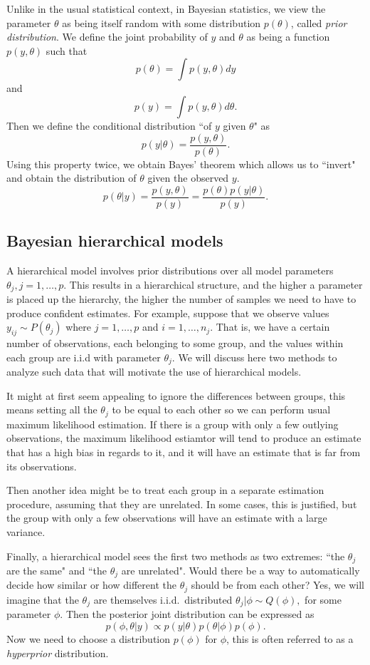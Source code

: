 \documentclass{scrartcl}
\newcommand{\1}{\mathds{1}}
\begin{document}
Unlike in the usual statistical context, in Bayesian statistics, we view the parameter $\theta$ as
being itself random with some distribution $p(\theta)$, called \emph{prior distribution}. We define the joint
probability of $y$ and $\theta$ as being a function $p(y,\theta)$ such that
\[p(\theta)         = \int p(y,\theta) dy      \]
and
\[p(y)  = \int p(y,\theta) d\theta.\]
Then we define the conditional distribution ``of $y$ given $\theta$" as
\[
	p(y|\theta) = \frac{p(y,\theta)}{p(\theta)}.
\]
Using this property twice, we obtain Bayes' theorem which allows us to ``invert"
and obtain the distribution of $\theta$ given the observed $y$.
\[ p(\theta|y) = \frac{p(y,\theta)}{p(y)} = \frac{p(\theta)p(y|\theta)}{p(y)}. \]

\subsection{Bayesian hierarchical models}
A hierarchical model involves prior distributions over all model parameters $\theta_j, j=1,\dots, p$. This results in a hierarchical structure, and the higher a parameter is placed
up the hierarchy, the higher the number of samples we need to have to produce
confident estimates.
For example, suppose that we observe values $y_{ij} \sim P(\theta_j)$ where $j=1,\dots,p$ and
$i=1,\dots,n_j$. That is, we have a certain number of observations,
each belonging to some group, and the values within each group are i.i.d with
parameter $\theta_j$. We will discuss here two methods to analyze such data
that will motivate the use of hierarchical models.

It might at first seem appealing to ignore the differences between groups, this
means setting all the $\theta_j$ to be equal to each other so we can perform
usual maximum likelihood estimation. If there is a group with only a few
outlying observations, the maximum likelihood estiamtor will tend to produce an
estimate that has a high bias in regards to it, and it will have an estimate
that is far from its observations.

Then another idea might be to treat each group in a separate estimation procedure, assuming
that they are unrelated. In some cases, this is
justified, but the group with only a few
observations will have an estimate with a large variance.

Finally, a hierarchical model sees the first two methods as two
extremes: ``the $\theta_j$ are the same" and ``the $\theta_j$ are unrelated".
Would there be a way to automatically decide how similar or how different the $\theta_j$ should be from each other?
Yes, we will imagine that the $\theta_j$ are themselves i.i.d.\ distributed
$\theta_j | \phi \sim Q(\phi),$ for some parameter $\phi.$ Then the posterior
joint distribution can be expressed as
\[p(\phi, \theta | y) \propto p(y | \theta) p(\theta | \phi) p(\phi).\]
Now we need to choose a distribution $p(\phi)$ for $\phi$, this is often
referred to as a \emph{hyperprior} distribution.
\end{document}
